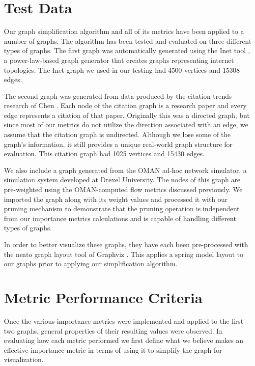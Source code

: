 \section{Test Data}
\label{sect:Data}
Our graph simplification algorithm and all of its metrics have been applied to a number of graphs.  The algorithm has been tested and evaluated on three different types of graphs. The first graph was automatically generated using the  Inet tool \cite{Winik-Jamin02}, a power-law-based graph generator that creates graphs representing internet topologies.  The Inet graph we used in our testing had 4500 vertices and 15308 edges.

The second graph was generated from data produced by the citation trends research of Chen \cite{Chen06}.  Each node of the citation graph is a research paper and every edge represents a citation of that paper.  Originally this was a directed graph, but since most of our metrics do not utilize the direction associated with an edge, we assume that the citation graph is undirected.  Although we lose some of the graph's information, it still provides a unique real-world graph structure for evaluation.  This citation graph had 1025 vertices and 15430 edges.

We also include a graph generated from the OMAN  ad-hoc network simulator, a simulation system developed at Drexel University.  The nodes of this graph are pre-weighted using the OMAN-computed flow metrics discussed previously.  We imported the graph along with its weight values and processed it with our pruning mechanism to demonstrate that the pruning operation is independent from our importance metrics calculations and is capable of handling different types of graphs.

In order to better visualize these graphs, they have each been pre-processed with the neato graph layout tool of Graphviz \cite{Graphviz}.  This applies a spring model layout to our graphs prior to applying our simplification algorithm.

\section{Metric Performance Criteria}
\label{sect:metric_criteria}

Once the various importance metrics were implemented and applied to the first two graphs, general properties of their resulting values were observed.  In evaluating how each metric performed we first define what we believe makes an effective importance metric in terms of using it to simplify the graph
for visualization.

